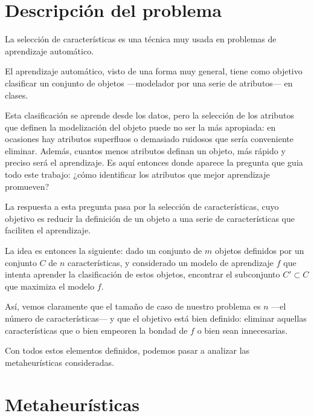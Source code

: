 \documentclass[a4paper, 11pt, titlepage]{article}
\begin{document}
    \maketitle

    \tableofcontents
    \newpage


    \section{Descripción del problema}
    La selección de características es una técnica muy usada en problemas de aprendizaje automático.

    El aprendizaje automático, visto de una forma muy general, tiene como objetivo clasificar un conjunto de objetos ---modelador por una serie de atributos--- en clases.

    Esta clasificación se aprende desde los datos, pero la selección de los atributos que definen la modelización del objeto puede no ser la más apropiada: en ocasiones hay atributos superfluos o demasiado ruidosos que sería conveniente eliminar. Además, cuantos menos atributos definan un objeto, más rápido y preciso será el aprendizaje. Es aquí entonces donde aparece la pregunta que guia todo este trabajo: ¿cómo identificar los atributos que mejor aprendizaje promueven?

    La respuesta a esta pregunta pasa por la selección de características, cuyo objetivo es reducir la definición de un objeto a una serie de características que faciliten el aprendizaje.

    La idea es entonces la siguiente: dado un conjunto de $m$ objetos definidos por un conjunto $C$ de $n$ características, y considerado un modelo de aprendizaje $f$ que intenta aprender la clasificación de estos objetos, encontrar el subconjunto $C' \subset C$ que maximiza el modelo $f$.

    Así, vemos claramente que el tamaño de caso de nuestro problema es $n$ ---el número de características--- y que el objetivo está bien definido: eliminar aquellas características que o bien empeoren la bondad de $f$ o bien sean innecesarias.

    Con todos estos elementos definidos, podemos pasar a analizar las metaheurísticas consideradas.

    \section{Metaheurísticas}
\end{document}
